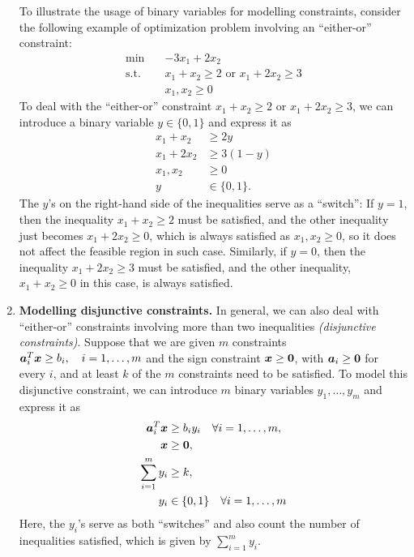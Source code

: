 \begin{enumerate}
To illustrate the usage of binary variables for modelling constraints, consider
the following example of optimization problem involving an ``either-or''
constraint:
\begin{align*}
\text{min}\quad&-3x_1+2x_2 \\
\text{s.t.}\quad&x_1+x_2\ge 2\text{ or }x_1+2x_2\ge 3 \\
\quad&x_1,x_2\ge 0
\end{align*}
To deal with the ``either-or'' constraint \(x_1+x_2\ge 2\text{ or }x_1+2x_2\ge
3\), we can introduce a binary variable \(y\in\{0,1\}\) and express it as
\begin{align*}
x_1+x_2&\ge 2y \\
x_1+2x_2&\ge 3(1-y) \\
x_1,x_2&\ge 0 \\
y&\in\{0,1\}.
\end{align*}
The \(y\)'s on the right-hand side of the inequalities serve as a ``switch'':
If \(y=1\), then the inequality \(x_1+x_2\ge 2\) must be satisfied, and the
other inequality just becomes \(x_1+2x_2\ge 0\), which is always satisfied
as \(x_1,x_2\ge 0\), so it does not affect the feasible region in such case.
Similarly, if \(y=0\), then the inequality \(x_1+2x_2\ge 3\) must be satisfied,
and the other inequality, \(x_1+x_2\ge 0\) in this case, is always satisfied.

\item\label{it:model-disj-const} \textbf{Modelling disjunctive constraints.} In
general, we can also deal with ``either-or'' constraints involving more than
two inequalities \emph{(disjunctive constraints)}. Suppose that we are given
\(m\) constraints \(\bm{a}_{i}^{T}\bm{x}\ge b_i,\quad i=1,\dotsc,m\) and
the sign constraint \(\bm{x}\ge\bm{0}\), with \(\bm{a}_i\ge\bm{0}\) for
every \(i\), and at least \(k\) of the \(m\) constraints need to be satisfied.
To model this disjunctive constraint, we can introduce \(m\) binary variables
\(y_1,\dotsc,y_m\) and express it as
\begin{align*}
\bm{a}_{i}^{T}\bm{x}&\ge b_iy_i\quad\forall i=1,\dotsc,m, \\
\bm{x}&\ge\bm{0}, \\
\sum_{i=1}^{m}y_i&\ge k, \\
y_i&\in\{0,1\}\quad\forall i=1,\dotsc,m
\end{align*}
Here, the \(y_i\)'s serve as both ``switches'' and also count the number of
inequalities satisfied, which is given by \(\sum_{i=1}^{m}y_i\).
\end{enumerate}
